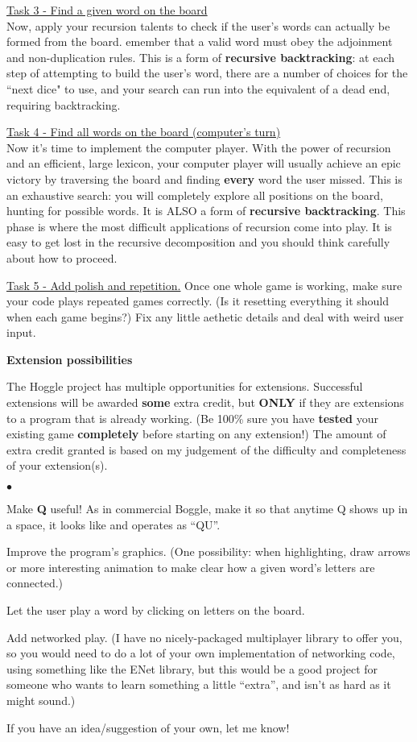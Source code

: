 \documentclass[12pt]{article}
\newcommand{\squishlist}{
   \begin{list}{$\bullet$}
    { \setlength{\itemsep}{5pt}      \setlength{\parsep}{0pt}
      \setlength{\topsep}{0pt}       \setlength{\partopsep}{0pt}
      \setlength{\leftmargin}{1.5em} \setlength{\labelwidth}{1em}
      \setlength{\labelsep}{0.5em} } }
\newcommand{\squishend}{\end{list}}
\begin{document}
\underline{Task 3 - Find a given word on the board}\\
Now, apply your recursion talents to check if the user's words can actually be formed from the board.  
emember that a valid word must obey the adjoinment and non-duplication rules. This is a form of 
{\bf recursive backtracking}: at each step of attempting to build the user's word, there are a number
of choices for the ``next dice" to use, and your search can run into the equivalent of a dead end, requiring
backtracking.

\pagebreak

\underline{Task 4 - Find all words on the board (computer's turn)}\\
Now it's time to implement the computer player.  With the power of recursion and an efficient,
large lexicon, your computer player will usually achieve an epic victory 
by traversing the board and finding {\bf every} word the user missed.
This is an exhaustive search: you will completely explore all positions on the board, hunting for possible words. 
It is ALSO a form of {\bf recursive backtracking}.
This phase is where the most difficult applications of recursion come into play.
It is easy to get lost in the recursive decomposition and you should think carefully about how to proceed.

\underline{Task 5 - Add polish and repetition.}
Once one whole game is working, make sure your code plays repeated games correctly. (Is it resetting everything it should
when each game begins?) Fix any little aethetic details and deal with weird user input.



\bigskip

\bigskip

{\bf Extension possibilities}

The Hoggle project has multiple opportunities for extensions. Successful extensions will be awarded {\bf some} extra credit,
but {\bf ONLY} if they are extensions to a program that is already working. (Be 100\% sure you have
{\bf tested} your existing game {\bf completely} before starting on any extension!) The amount of extra credit
granted is based on my judgement of the difficulty and completeness of your extension(s).

\squishlist
\item Make {\bf Q} useful! As in commercial Boggle, make it so that anytime Q shows up in a space, it looks like and operates as ``QU''.
\item Improve the program's graphics. (One possibility: when highlighting, draw arrows or
more interesting animation to make clear how a given word's letters
are connected.)
\item Let the user play a word by clicking on letters on the board.
\item Add networked play. (I have no nicely-packaged multiplayer
library to offer you, so you would need to do a lot of your own implementation of networking code,
using something like the ENet library, but this would be a good project for someone who wants to learn
something a little ``extra'', and isn't as hard as it might sound.)
\item If you have an idea/suggestion of your own, let me know!
\squishend
\end{document}
